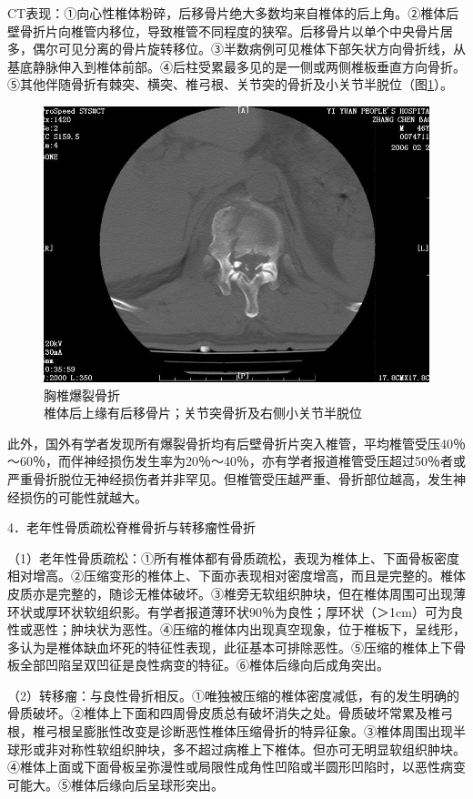 CT表现：①向心性椎体粉碎，后移骨片绝大多数均来自椎体的后上角。②椎体后壁骨折片向椎管内移位，导致椎管不同程度的狭窄。后移骨片以单个中央骨片居多，偶尔可见分离的骨片旋转移位。③半数病例可见椎体下部矢状方向骨折线，从基底静脉伸入到椎体前部。④后柱受累最多见的是一侧或两侧椎板垂直方向骨折。⑤其他伴随骨折有棘突、横突、椎弓根、关节突的骨折及小关节半脱位（图\ref{fig22-8}）。

\begin{figure}[!htbp]
 \centering
 \includegraphics[width=.7\textwidth,height=\textheight,keepaspectratio]{./images/Image00424.jpg}
 \captionsetup{justification=centering}
 \caption{胸椎爆裂骨折\\{\small 椎体后上缘有后移骨片；关节突骨折及右侧小关节半脱位}}
 \label{fig22-8}
  \end{figure} 

此外，国外有学者发现所有爆裂骨折均有后壁骨折片突入椎管，平均椎管受压40％～60％，而伴神经损伤发生率为20％～40％，亦有学者报道椎管受压超过50％者或严重骨折脱位无神经损伤者并非罕见。但椎管受压越严重、骨折部位越高，发生神经损伤的可能性就越大。

4．老年性骨质疏松脊椎骨折与转移瘤性骨折

（1）老年性骨质疏松：①所有椎体都有骨质疏松，表现为椎体上、下面骨板密度相对增高。②压缩变形的椎体上、下面亦表现相对密度增高，而且是完整的。椎体皮质亦是完整的，随诊无椎体破坏。③椎旁无软组织肿块，但在椎体周围可出现薄环状或厚环状软组织影。有学者报道薄环状90％为良性；厚环状（＞1cm）可为良性或恶性；肿块状为恶性。④压缩的椎体内出现真空现象，位于椎板下，呈线形，多认为是椎体缺血坏死的特征性表现，此征基本可排除恶性。⑤压缩的椎体上下骨板全部凹陷呈双凹征是良性病变的特征。⑥椎体后缘向后成角突出。

（2）转移瘤：与良性骨折相反。①唯独被压缩的椎体密度减低，有的发生明确的骨质破坏。②椎体上下面和四周骨皮质总有破坏消失之处。骨质破坏常累及椎弓根，椎弓根呈膨胀性改变是诊断恶性椎体压缩骨折的特异征象。③椎体周围出现半球形或非对称性软组织肿块，多不超过病椎上下椎体。但亦可无明显软组织肿块。④椎体上面或下面骨板呈弥漫性或局限性成角性凹陷或半圆形凹陷时，以恶性病变可能大。⑤椎体后缘向后呈球形突出。

